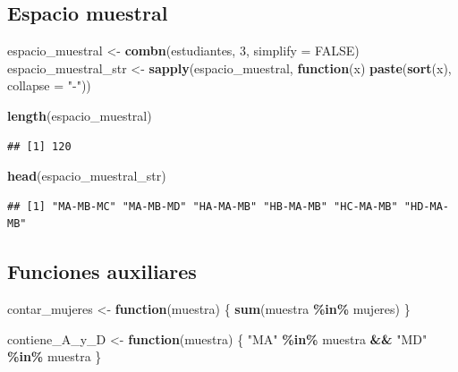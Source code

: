 \documentclass[
]{article}
\newenvironment{Shaded}{\begin{snugshade}}{\end{snugshade}}
\newcommand{\AttributeTok}[1]{\textcolor[rgb]{0.13,0.29,0.53}{#1}}
\newcommand{\ConstantTok}[1]{\textcolor[rgb]{0.56,0.35,0.01}{#1}}
\newcommand{\ControlFlowTok}[1]{\textcolor[rgb]{0.13,0.29,0.53}{\textbf{#1}}}
\newcommand{\DecValTok}[1]{\textcolor[rgb]{0.00,0.00,0.81}{#1}}
\newcommand{\FunctionTok}[1]{\textcolor[rgb]{0.13,0.29,0.53}{\textbf{#1}}}
\newcommand{\NormalTok}[1]{#1}
\newcommand{\OtherTok}[1]{\textcolor[rgb]{0.56,0.35,0.01}{#1}}
\newcommand{\SpecialCharTok}[1]{\textcolor[rgb]{0.81,0.36,0.00}{\textbf{#1}}}
\newcommand{\StringTok}[1]{\textcolor[rgb]{0.31,0.60,0.02}{#1}}
\begin{document}
\subsection{Espacio muestral}\label{espacio-muestral}

\begin{Shaded}
\begin{Highlighting}[]
\NormalTok{espacio\_muestral }\OtherTok{\textless{}{-}} \FunctionTok{combn}\NormalTok{(estudiantes, }\DecValTok{3}\NormalTok{, }\AttributeTok{simplify =} \ConstantTok{FALSE}\NormalTok{)}
\NormalTok{espacio\_muestral\_str }\OtherTok{\textless{}{-}} \FunctionTok{sapply}\NormalTok{(espacio\_muestral, }\ControlFlowTok{function}\NormalTok{(x) }\FunctionTok{paste}\NormalTok{(}\FunctionTok{sort}\NormalTok{(x), }\AttributeTok{collapse =} \StringTok{"{-}"}\NormalTok{))}

\FunctionTok{length}\NormalTok{(espacio\_muestral)}
\end{Highlighting}
\end{Shaded}

\begin{verbatim}
## [1] 120
\end{verbatim}

\begin{Shaded}
\begin{Highlighting}[]
\FunctionTok{head}\NormalTok{(espacio\_muestral\_str)}
\end{Highlighting}
\end{Shaded}

\begin{verbatim}
## [1] "MA-MB-MC" "MA-MB-MD" "HA-MA-MB" "HB-MA-MB" "HC-MA-MB" "HD-MA-MB"
\end{verbatim}

\subsection{Funciones auxiliares}\label{funciones-auxiliares}

\begin{Shaded}
\begin{Highlighting}[]
\NormalTok{contar\_mujeres }\OtherTok{\textless{}{-}} \ControlFlowTok{function}\NormalTok{(muestra) \{}
  \FunctionTok{sum}\NormalTok{(muestra }\SpecialCharTok{\%in\%}\NormalTok{ mujeres)}
\NormalTok{\}}

\NormalTok{contiene\_A\_y\_D }\OtherTok{\textless{}{-}} \ControlFlowTok{function}\NormalTok{(muestra) \{}
  \StringTok{"MA"} \SpecialCharTok{\%in\%}\NormalTok{ muestra }\SpecialCharTok{\&\&} \StringTok{"MD"} \SpecialCharTok{\%in\%}\NormalTok{ muestra}
\NormalTok{\}}
\end{Highlighting}
\end{Shaded}
\end{document}
